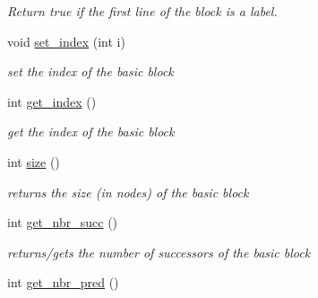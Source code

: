 \begin{DoxyCompactItemize}
\begin{DoxyCompactList}\small\item\em Return true if the first line of the block is a label. \item\end{DoxyCompactList}\item 
\hypertarget{classBasic__block_a5bdba6b1e3307dc03c38b8249c4b3fa8}{
void \hyperlink{classBasic__block_a5bdba6b1e3307dc03c38b8249c4b3fa8}{set\_\-index} (int i)}
\label{classBasic__block_a5bdba6b1e3307dc03c38b8249c4b3fa8}

\begin{DoxyCompactList}\small\item\em set the index of the basic block \item\end{DoxyCompactList}\item 
\hypertarget{classBasic__block_a8cb196904537be8fb0474afce7c769c1}{
int \hyperlink{classBasic__block_a8cb196904537be8fb0474afce7c769c1}{get\_\-index} ()}
\label{classBasic__block_a8cb196904537be8fb0474afce7c769c1}

\begin{DoxyCompactList}\small\item\em get the index of the basic block \item\end{DoxyCompactList}\item 
\hypertarget{classBasic__block_a5574d52e3ecdbf36e52c42c31bfc73db}{
int \hyperlink{classBasic__block_a5574d52e3ecdbf36e52c42c31bfc73db}{size} ()}
\label{classBasic__block_a5574d52e3ecdbf36e52c42c31bfc73db}

\begin{DoxyCompactList}\small\item\em returns the size (in nodes) of the basic block \item\end{DoxyCompactList}\item 
\hypertarget{classBasic__block_a827326ead14a65b7399508fadebbc016}{
int \hyperlink{classBasic__block_a827326ead14a65b7399508fadebbc016}{get\_\-nbr\_\-succ} ()}
\label{classBasic__block_a827326ead14a65b7399508fadebbc016}

\begin{DoxyCompactList}\small\item\em returns/gets the number of successors of the basic block \item\end{DoxyCompactList}\item 
\hypertarget{classBasic__block_aaeb7039e977c75a5ff6ec052b5a173d5}{
int \hyperlink{classBasic__block_aaeb7039e977c75a5ff6ec052b5a173d5}{get\_\-nbr\_\-pred} ()}
\label{classBasic__block_aaeb7039e977c75a5ff6ec052b5a173d5}


\end{DoxyCompactItemize}
